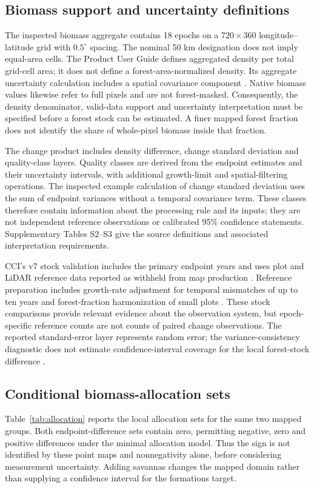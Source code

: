\documentclass[11pt,a4paper]{article}
\begin{document}
\subsection{Biomass support and uncertainty definitions}
The inspected biomass aggregate contains 18 epochs on a $720\times360$ longitude--latitude grid with $0.5^\circ$ spacing. The nominal 50 km designation does not imply equal-area cells. The Product User Guide defines aggregated density per total grid-cell area; it does not define a forest-area-normalized density. Its aggregate uncertainty calculation includes a spatial covariance component \citep{PUG2026}. Native biomass values likewise refer to full pixels and are not forest-masked. Consequently, the density denominator, valid-data support and uncertainty interpretation must be specified before a forest stock can be estimated. A finer mapped forest fraction does not identify the share of whole-pixel biomass inside that fraction.

The change product includes density difference, change standard deviation and quality-class layers. Quality classes are derived from the endpoint estimates and their uncertainty intervals, with additional growth-limit and spatial-filtering operations. The inspected example calculation of change standard deviation uses the sum of endpoint variances without a temporal covariance term. These classes therefore contain information about the processing rule and its inputs; they are not independent reference observations or calibrated 95\% confidence statements. Supplementary Tables S2--S3 give the source definitions and associated interpretation requirements.

CCI's v7 stock validation includes the primary endpoint years and uses plot and LiDAR reference data reported as withheld from map production \citep[pp.~11--14, 64, 67]{PVIR2026}. Reference preparation includes growth-rate adjustment for temporal mismatches of up to ten years and forest-fraction harmonization of small plots \citep[p.~18]{PVIR2026}. These stock comparisons provide relevant evidence about the observation system, but epoch-specific reference counts are not counts of paired change observations. The reported standard-error layer represents random error; the variance-consistency diagnostic does not estimate confidence-interval coverage for the local forest-stock difference \citep[p.~19]{PVIR2026}.

\subsection{Conditional biomass-allocation sets}
Table~\ref{tab:allocation} reports the local allocation sets for the same two mapped groups. Both endpoint-difference sets contain zero, permitting negative, zero and positive differences under the minimal allocation model. Thus the sign is not identified by these point maps and nonnegativity alone, before considering measurement uncertainty. Adding savannas changes the mapped domain rather than supplying a confidence interval for the formations target.
\end{document}
